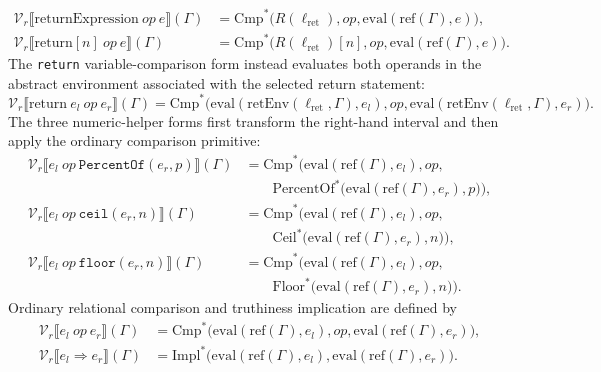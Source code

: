 \documentclass[11pt,oneside]{report}
\theoremstyle{plain}
\theoremstyle{definition}
\theoremstyle{remark}
\begin{document}
\begin{align*}
\mathcal{V}_{r}\llbracket
\text{returnExpression}\ \mathit{op}\ e
\rrbracket(\Gamma)
&=
\mathrm{Cmp}^{*}\bigl(
R(\ell_{\text{ret}}),
\mathit{op},
\mathrm{eval}(\mathrm{ref}(\Gamma),e)
\bigr),
\\[3pt]
%
\mathcal{V}_{r}\llbracket
\text{return}[n]\ \mathit{op}\ e
\rrbracket(\Gamma)
&=
\mathrm{Cmp}^{*}\bigl(
R(\ell_{\text{ret}})[n],
\mathit{op},
\mathrm{eval}(\mathrm{ref}(\Gamma),e)
\bigr).
\end{align*}
The \texttt{return} variable-comparison form instead evaluates both operands in the abstract environment associated with the selected return statement:
\[
\mathcal{V}_{r}\llbracket
\text{return}\ e_l\ \mathit{op}\ e_r
\rrbracket(\Gamma)
=
\mathrm{Cmp}^{*}\bigl(
\mathrm{eval}(
\mathrm{retEnv}(\ell_{\text{ret}},\Gamma),
e_l
),
\mathit{op},
\mathrm{eval}(
\mathrm{retEnv}(\ell_{\text{ret}},\Gamma),
e_r
)
\bigr).
\]
The three numeric-helper forms first transform the right-hand interval and then apply the ordinary comparison primitive:
\begin{align*}
\mathcal{V}_{r}\llbracket
e_l\ \mathit{op}\ \texttt{PercentOf}(e_r,p)
\rrbracket(\Gamma)
&=
\mathrm{Cmp}^{*}\bigl(
\mathrm{eval}(\mathrm{ref}(\Gamma),e_l),
\mathit{op},
\\
&\qquad
\mathrm{PercentOf}^{*}\bigl(
\mathrm{eval}(\mathrm{ref}(\Gamma),e_r),
p
\bigr)
\bigr),
\\[3pt]
%
\mathcal{V}_{r}\llbracket
e_l\ \mathit{op}\ \texttt{ceil}(e_r,n)
\rrbracket(\Gamma)
&=
\mathrm{Cmp}^{*}\bigl(
\mathrm{eval}(\mathrm{ref}(\Gamma),e_l),
\mathit{op},
\\
&\qquad
\mathrm{Ceil}^{*}\bigl(
\mathrm{eval}(\mathrm{ref}(\Gamma),e_r),
n
\bigr)
\bigr),
\\[3pt]
%
\mathcal{V}_{r}\llbracket
e_l\ \mathit{op}\ \texttt{floor}(e_r,n)
\rrbracket(\Gamma)
&=
\mathrm{Cmp}^{*}\bigl(
\mathrm{eval}(\mathrm{ref}(\Gamma),e_l),
\mathit{op},
\\
&\qquad
\mathrm{Floor}^{*}\bigl(
\mathrm{eval}(\mathrm{ref}(\Gamma),e_r),
n
\bigr)
\bigr).
\end{align*}
Ordinary relational comparison and truthiness implication are defined by
\begin{align*}
\mathcal{V}_{r}\llbracket
e_l\ \mathit{op}\ e_r
\rrbracket(\Gamma)
&=
\mathrm{Cmp}^{*}\bigl(
\mathrm{eval}(\mathrm{ref}(\Gamma),e_l),
\mathit{op},
\mathrm{eval}(\mathrm{ref}(\Gamma),e_r)
\bigr),
\\[3pt]
%
\mathcal{V}_{r}\llbracket
e_l \Rightarrow e_r
\rrbracket(\Gamma)
&=
\mathrm{Impl}^{*}\bigl(
\mathrm{eval}(\mathrm{ref}(\Gamma),e_l),
\mathrm{eval}(\mathrm{ref}(\Gamma),e_r)
\bigr).
\end{align*}
\end{document}
